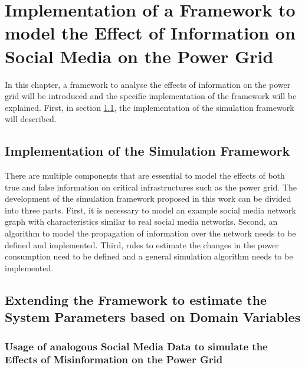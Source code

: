 \chapter{Implementation of a Framework to model the Effect
of Information on Social Media on the Power Grid}

In this chapter, a framework to analyse the effects of information on the 
power grid will be introduced and the specific implementation of the 
framework will be explained.
First, in section \ref{simulationframeworksection}, 
the implementation of the simulation framework will described.


\section{Implementation of the Simulation Framework}
\label{simulationframeworksection}
There are multiple components that are essential to model the effects of 
both true and false information on critical infrastructures
such as the power grid. The development of the simulation framework
proposed in this work can be divided into three parts. First, it is necessary to model an 
example social media network graph with characteristics similar to
real social media networks. Second, an algorithm to model the 
propagation of information over the network needs to be defined and 
implemented. Third, rules to estimate the changes in the power consumption 
need to be defined and a general simulation algorithm needs to be implemented.




\section{Extending the Framework to estimate the System Parameters based on
Domain Variables}


\subsection{Usage of analogous Social Media Data to simulate the Effects of 
Misinformation on the Power Grid}